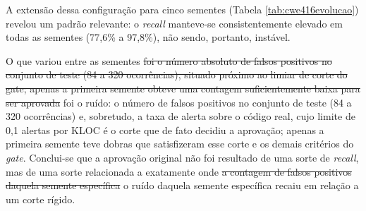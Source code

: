 \documentclass[
    12pt,                %
    openright,           %
    oneside,             %
    a4paper,             %
    english,             %
    brazil               %
]{abntex2}
\newcommand{\antigo}[1]{\sout{#1}}
\newcommand{\novo}[1]{{\color{red}#1}}
\begin{document}
\par
A extensão dessa configuração para cinco sementes (Tabela \ref{tab:cwe416evolucao}) revelou um padrão relevante: o \textit{recall} manteve-se consistentemente elevado em todas as sementes (77,6\% a 97,8\%), não sendo, portanto, instável.
\par
O que variou entre as sementes \antigo{foi o número absoluto de falsos positivos no conjunto de teste (84 a 320 ocorrências), situado próximo ao limiar de corte do gate; apenas a primeira semente obteve uma contagem suficientemente baixa para ser aprovada} \novo{foi o ruído: o número de falsos positivos no conjunto de teste (84 a 320 ocorrências) e, sobretudo, a taxa de alerta sobre o código real, cujo limite de 0,1 alertas por KLOC é o corte que de fato decidiu a aprovação; apenas a primeira semente teve dobras que satisfizeram esse corte e os demais critérios do \textit{gate}}.
Conclui-se que a aprovação original não foi resultado de uma sorte de \textit{recall}, mas de uma sorte relacionada a exatamente onde \antigo{a contagem de falsos positivos daquela semente específica} \novo{o ruído daquela semente específica} recaiu em relação a um corte rígido.
\end{document}
